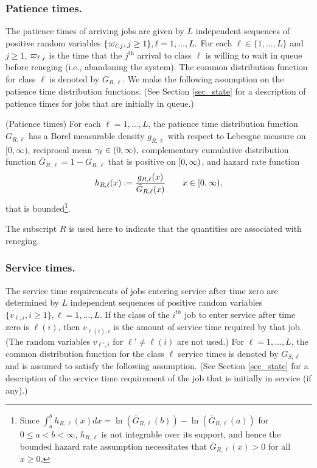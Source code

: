 \documentclass[stsy]{informs-stsy}
\begin{document}
\subsubsection*{Patience times.}
The patience times of arriving jobs are given by $L$ independent sequences of positive random variables  $\{\varpi_{\ell,j},j\geq1\}, \ell=1,...,L.$  For each $\ell \in \{ 1,\ldots, L\}$ and $j\geq 1$, 
$\varpi_{\ell, j}$ is the time that the $j^{\text{th}}$ arrival to class $\ell $ is willing to wait in queue   before reneging (i.e., abandoning the system). 
The common distribution function for class $\ell$ is denoted by $G_{R,\ell}$.  We make the following assumption on the patience time distribution functions. 
(See Section \ref{sec_state} for a description of patience times for jobs that are initially in queue.)
\begin{assumption}\label{asm_patience}
  (Patience times) For each $\ell=1,...,L$, the patience time distribution function $G_{R,\ell}$ has a Borel measurable density $g_{R,\ell}$ with respect to Lebesgue measure on $[0,\infty)$, reciprocal mean $\gamma_{\ell}\in(0,\infty),$  complementary cumulative distribution function $\bar G_{R,\ell}=1-G_{R,\ell}$ that is positive on $[0,\infty)$, and hazard rate function 
\[
h_{R,\ell}(x):=\frac{g_{R,\ell}(x)}{\bar G_{R,\ell}(x)}\quad\quad x\in[0,\infty),
\]
that is bounded\footnote{Since $\int_a^b h_{R,\ell}(x)dx = \ln(\bar G_{R,\ell}(b)) - \ln(\bar G_{R,\ell}(a))$ for $0\leq a<b <\infty$, $h_{R,\ell}$ is not integrable over its support, and hence the   bounded hazard rate assumption necessitates that $\bar G_{R,\ell}(x)>0$ for all $x\geq 0$.}.
\end{assumption}
The subscript $R$ is used here to indicate that the quantities are associated with reneging. 

\subsubsection*{Service times.}
The service time requirements of jobs entering service after time zero are determined by $L$ independent sequences of positive random variables  $\{v_{\ell,i},i\geq1\}, \ell=1,...,L.$ 
If the class of the $i^{th}$ job to enter service after time zero is $\ell(i)$, then $v_{\ell(i), i}$ is the amount of service time required by that job. (The random variables 
$v_{\ell', i}$ for $\ell'\not=\ell(i)$ are not used.) For $\ell =1, \ldots, L$, 
the common distribution function for the class $\ell$ service times is denoted by $G_{S,\ell}$ and is assumed to satisfy the following assumption. 
(See Section \ref{sec_state} for a description of the service time requirement of the job that is initially in service (if any).)
\end{document}
